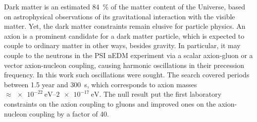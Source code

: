 Dark matter is an estimated \SI{84}{\percent} of the matter content of the Universe, based on astrophysical observations of its gravitational interaction with the visible matter. Yet, the dark matter constraints remain elusive for particle physics. An axion is a prominent candidate for a dark matter particle, which is expected to couple to ordinary matter in other ways, besides gravity. In particular, it may couple to the neutrons in the PSI nEDM experiment via a scalar axion-gluon or a vector axion-nucleon coupling, causing harmonic oscillations in their precession frequency. In this work such oscillations were sought. The search covered periods between \num{1.5} year and \SI{300}{\second}, which corresponds to axion masses $\approx \SIrange[range-phrase=--]{e-22}{2e-17}{\electronvolt}$. The null result put the first laboratory constraints on the axion coupling to gluons and improved ones on the axion-nucleon coupling by a factor of 40.

\enlargethispage{2\baselineskip}

\endgroup			

\vfill
